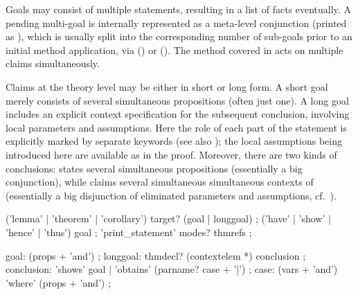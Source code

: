 \begin{isabellebody}
\begin{isamarkuptext}
  Goals may consist of multiple statements, resulting in a list of
  facts eventually.  A pending multi-goal is internally represented as
  a meta-level conjunction (printed as \isa{{\isachardoublequote}{\isacharampersand}{\isacharampersand}{\isachardoublequote}}), which is usually
  split into the corresponding number of sub-goals prior to an initial
  method application, via \hyperlink{command.proof}{\mbox{}}
  () or \hyperlink{command.apply}{\mbox{}}
  ().  The \hyperlink{method.induct}{\mbox{}} method
  covered in  acts on multiple claims
  simultaneously.

  Claims at the theory level may be either in short or long form.  A
  short goal merely consists of several simultaneous propositions
  (often just one).  A long goal includes an explicit context
  specification for the subsequent conclusion, involving local
  parameters and assumptions.  Here the role of each part of the
  statement is explicitly marked by separate keywords (see also
  ); the local assumptions being introduced here
  are available as \hyperlink{fact.assms}{\mbox{}} in the proof.  Moreover, there
  are two kinds of conclusions: \hypertarget{element.shows}{\hyperlink{element.shows}{\mbox{}}} states several
  simultaneous propositions (essentially a big conjunction), while
  \hypertarget{element.obtains}{\hyperlink{element.obtains}{\mbox{}}} claims several simultaneous simultaneous
  contexts of (essentially a big disjunction of eliminated parameters
  and assumptions, cf.\ ).

  \begin{rail}
    ('lemma' | 'theorem' | 'corollary') target? (goal | longgoal)
    ;
    ('have' | 'show' | 'hence' | 'thus') goal
    ;
    'print\_statement' modes? thmrefs
    ;
  
    goal: (props + 'and')
    ;
    longgoal: thmdecl? (contextelem *) conclusion
    ;
    conclusion: 'shows' goal | 'obtains' (parname? case + '|')
    ;
    case: (vars + 'and') 'where' (props + 'and')
    ;
  \end{rail}

  \begin{descr}
  

\end{descr}
\end{isamarkuptext}
\end{isabellebody}
